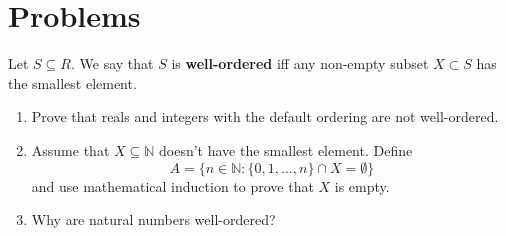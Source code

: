 \section{Problems}
\begin{exercise}
	Let $S\subseteq R$. We say that $S$ is \textbf{well-ordered} iff any non-empty subset $X\subset S$ has the smallest element.
	\begin{enumerate}
		\item Prove that reals and integers with the default ordering are not well-ordered.
		\item Assume that $X\subseteq \mathbb N$ doesn't have the smallest element. Define $$A=\{n\in \mathbb N : \{0,1,\dots,n\}\cap X=\emptyset\}$$
			and use mathematical induction to prove that $X$ is empty.
		\item Why are natural numbers well-ordered?
	\end{enumerate}
\end{exercise}
